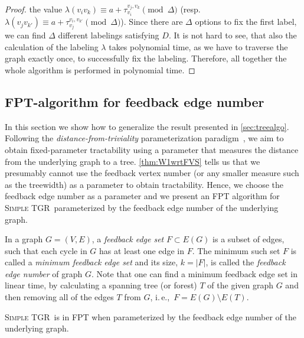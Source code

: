 \documentclass[a4paper,UKenglish,cleveref, autoref, thm-restate,anonymous]{lipics-v2021}
\newcommand{\ie}{i.\,e.,\ }
\newcommand{\deltaExact}{\textsc{Simple TGR}}
\begin{document}
\begin{proof}
    the value $\lambda(v_iv_k) \equiv a + \tau_{v_i}^{v_j,v_k} \pmod \Delta $ (resp.~$\lambda(v_j v_{k'}) \equiv a + \tau_{v_j}^{v_i,v_{k'}} \pmod \Delta $).
    Since there are $\Delta$ options to fix the first label, we can find $\Delta$ different labelings satisfying $D$.
    It is not hard to see, that also the calculation of the labeling $\lambda$ takes polynomial time, as we have to traverse the graph exactly once, to successfully fix the labeling. Therefore, all together the whole algorithm is performed in polynomial time.
\end{proof}






\subsection{FPT-algorithm for feedback edge number}\label{sec:FPT}

In this section we show how to generalize the result presented in \cref{sec:treealgo}. Following the \emph{distance-from-triviality} parameterization paradigm~\cite{FJR13,GHN04}, we aim to obtain fixed-parameter tractability using a parameter that measures the distance from the underlying graph to a tree. \cref{thm:W1wrtFVS} tells us that we presumably cannot use the feedback vertex number (or any smaller measure such as the treewidth) as a parameter to obtain tractability. Hence, we choose the feedback edge number as a parameter and we present an FPT algorithm for \deltaExact\ parameterized by the feedback edge number of the underlying graph.

In a graph $G=(V,E)$, a \emph{feedback edge set} $F \subset E(G)$ is a subset of edges, such that each cycle in $G$ has at least one edge in $F$.
The minimum such set $F$ is called a  \emph{minimum feedback edge set} and its size, $k = |F|$, is called the \emph{feedback edge number} of graph $G$.
Note that one can find a minimum feedback edge set in linear time, by calculating a spanning tree (or forest) $T$ of the given graph $G$ and then removing all of the edges $T$ from $G$, \ie $F = E(G) \setminus E(T)$.

\begin{theorem}[$\star$]\label{thm:FPTwrtFES}
    \deltaExact\ is in FPT when parameterized by the feedback edge number of the underlying graph.
\end{theorem}
\end{document}
